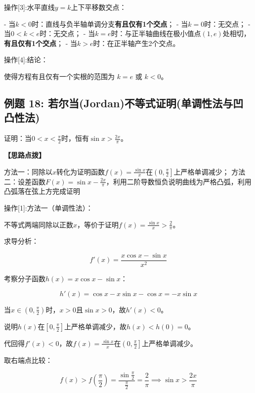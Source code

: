 \documentclass[11pt,a4paper,UTF8]{ctexart}
\begin{document}
操作[3]:水平直线$y = k$上下平移数交点：

\begin{solbox}[分步推导与答题规范]
- 当$k < 0$时：直线与负半轴单调分支\textbf{有且仅有1个交点}；
- 当$k = 0$时：无交点；
- 当$0 < k < e$时：无交点；
- 当$k = e$时：与正半轴曲线在极小值点$(1, e)$处相切，\textbf{有且仅有1个交点}；
- 当$k > e$时：在正半轴产生2个交点。
\end{solbox}

操作[4]:结论：

\begin{solbox}[分步推导与答题规范]
使得方程有且仅有一个实根的范围为 \textit{}$k = e$ 或 $k < 0$\textit{}。
\end{solbox}


\subsection{例题 18: 若尔当(Jordan)不等式证明(单调性法与凹凸性法)}

证明：当$0 < x < \frac{\pi}{2}$时，恒有$\sin x > \frac{2x}{\pi}$。

\textbf{\color{DeepPurple}【思路点拨】} 

方法一：同除以$x$转化为证明函数$f(x) = \frac{\sin x}{x}$在$\left(0, \frac{\pi}{2}\right]$上严格单调减少；
方法二：设差函数$F(x) = \sin x - \frac{2x}{\pi}$，利用二阶导数恒负说明曲线为严格凸弧，利用凸弧落在弦上方完成证明

操作[1]:方法一（单调性法）：

\begin{solbox}[分步推导与答题规范]
不等式两端同除以正数$x$，等价于证明$f(x) = \frac{\sin x}{x} > \frac{2}{\pi}$。

求导分析：


\begin{equation*}
f'(x) = \frac{x\cos x - \sin x}{x^2}
\end{equation*}


考察分子函数$h(x) = x\cos x - \sin x$：


\begin{equation*}
h'(x) = \cos x - x\sin x - \cos x = -x\sin x
\end{equation*}


当$x \in \left(0, \frac{\pi}{2}\right)$时，$x > 0$且$\sin x > 0$，故$h'(x) < 0$。

说明$h(x)$在$\left[0, \frac{\pi}{2}\right]$上严格单调减少，故$h(x) < h(0) = 0$。

代回得$f'(x) < 0$，故$f(x) = \frac{\sin x}{x}$在$\left(0, \frac{\pi}{2}\right]$上严格单调减少。

取右端点比较：


\begin{equation*}
f(x) > f\left(\frac{\pi}{2}\right) = \frac{\sin\frac{\pi}{2}}{\frac{\pi}{2}} = \frac{2}{\pi} \implies \sin x > \frac{2x}{\pi}
\end{equation*}

\end{solbox}
\end{document}
